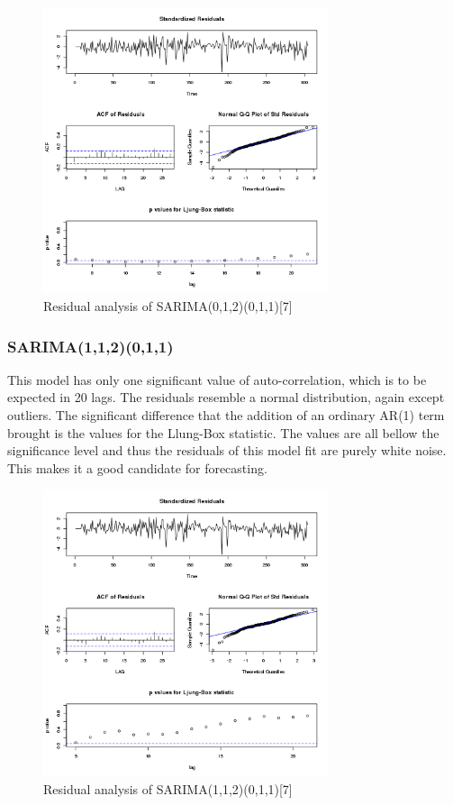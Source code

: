 \begin{figure}[!htb]
\begin{center}
\includegraphics[width=8.4cm]{residuals_model3.png}    %
\caption{Residual analysis of SARIMA(0,1,2)(0,1,1)[7]} 
\label{fig:residuals_model3}
\end{center}
\end{figure}

\subsubsection{SARIMA(1,1,2)(0,1,1)} This model has only one significant value of auto-correlation, which is to be expected in 20 lags. The residuals resemble a normal distribution, again except outliers. The significant difference that the addition of an ordinary AR(1) term brought is the values for the Llung-Box statistic. The values are all bellow the significance level and thus the residuals of this model fit are purely white noise. This makes it a good candidate for forecasting. 

\begin{figure}[!htb]
\begin{center}
\includegraphics[width=8.4cm]{residuals_model4.png}    %
\caption{Residual analysis of SARIMA(1,1,2)(0,1,1)[7]} 
\label{fig:residuals_model4}
\end{center}
\end{figure}

